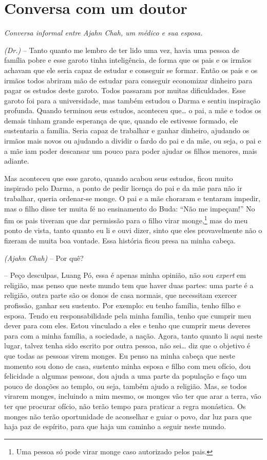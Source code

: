 
\chapter{Conversa com um doutor}

{\itshape
Conversa informal entre Ajahn Chah, um médico e sua esposa.}

\textit{(Dr.)} -- Tanto quanto me lembro de ter lido uma vez, havia
uma pessoa de família pobre e esse garoto tinha inteligência, de forma
que os pais e os irmãos achavam que ele seria capaz de estudar e
conseguir se formar. Então os pais e os irmãos todos abriram mão de
estudar para conseguir economizar dinheiro para pagar os estudos deste
garoto. Todos passaram por muitas dificuldades. Esse garoto foi para a
universidade, mas também estudou o Darma e sentiu inspiração profunda.
Quando terminou seus estudos, aconteceu que… o pai, a mãe e todos os
demais tinham grande esperança de que, quando ele estivesse formado,
ele sustentaria a família. Seria capaz de trabalhar e ganhar dinheiro,
ajudando os irmãos mais novos ou ajudando a dividir o fardo do pai e da
mãe, ou seja, o pai e a mãe iam poder descansar um pouco para poder
ajudar os filhos menores, mais adiante. 

Mas aconteceu que esse garoto, quando acabou seus estudos, ficou
muito inspirado pelo Darma, a ponto de pedir licença do pai e da mãe
para não ir trabalhar, queria ordenar-se monge. O pai e a mãe choraram
e tentaram impedir, mas o filho disse ter muita fé no ensinamento do
Buda: “Não me impeçam!” No fim os pais tiveram que dar permissão para o
filho virar monge,\footnote{Uma pessoa só pode virar monge caso
autorizado pelos pais.} mas do meu ponto de vista, tanto quanto eu li
e ouvi dizer, sinto que eles provavelmente não o fizeram de muita boa
vontade. Essa história ficou presa na minha cabeça. 

\textit{(Ajahn Chah)} -- Por quê? 

-- Peço desculpas, Luang Pó, essa é apenas minha opinião, não sou
\textit{expert} em religião, mas penso que neste mundo tem que haver
duas partes: uma parte é a religião, outra parte são os donos de casa
normais, que necessitam exercer profissão, ganhar seu sustento. Por
exemplo: eu tenho família, tenho filho e esposa. Tendo eu
responsabilidade pela minha família, tenho que cumprir meu dever para
com eles. Estou vinculado a eles e tenho que cumprir meus deveres para
com a minha família, a sociedade, a nação. Agora, tanto quanto li aqui
neste lugar, talvez tenha sido escrito por outra pessoa, não sei… diz
que o objetivo é que todas as pessoas virem monges. Eu penso na minha
cabeça que neste momento sou dono de casa, sustento minha esposa e
filho com meu ofício, dou felicidade a algumas pessoas, dou ajuda a uma
parte da população e faço um pouco de doações ao templo, ou seja,
também ajudo a religião. Mas, se todos virarem monges, incluindo a mim
mesmo, os monges vão ter que arar a terra, vão ter que procurar ofício,
não terão tempo para praticar a regra monástica. Os monges não terão
oportunidade de aconselhar e guiar o povo, dar luz para que haja paz de
espírito, para que haja um caminho a seguir neste mundo. 

